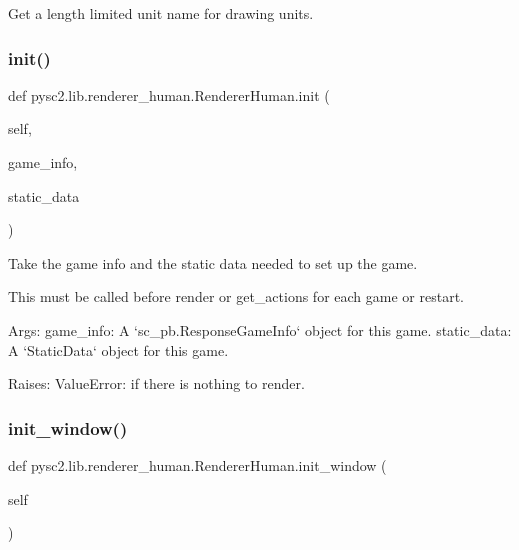 \begin{DoxyVerb}Get a length limited unit name for drawing units.\end{DoxyVerb}
 \mbox{\label{classpysc2_1_1lib_1_1renderer__human_1_1_renderer_human_a5f454c5d09ca1ef6e270fd0b1823ac09}} 
\subsubsection{\texorpdfstring{init()}{init()}}
{\footnotesize\ttfamily def pysc2.\+lib.\+renderer\+\_\+human.\+Renderer\+Human.\+init (\begin{DoxyParamCaption}\item[{}]{self,  }\item[{}]{game\+\_\+info,  }\item[{}]{static\+\_\+data }\end{DoxyParamCaption})}

\begin{DoxyVerb}Take the game info and the static data needed to set up the game.

This must be called before render or get_actions for each game or restart.

Args:
  game_info: A `sc_pb.ResponseGameInfo` object for this game.
  static_data: A `StaticData` object for this game.

Raises:
  ValueError: if there is nothing to render.
\end{DoxyVerb}
 \mbox{\label{classpysc2_1_1lib_1_1renderer__human_1_1_renderer_human_ab8c4fc4c1c501a62c5f13315c1d0268b}} 
\subsubsection{\texorpdfstring{init\+\_\+window()}{init\_window()}}
{\footnotesize\ttfamily def pysc2.\+lib.\+renderer\+\_\+human.\+Renderer\+Human.\+init\+\_\+window (\begin{DoxyParamCaption}\item[{}]{self }\end{DoxyParamCaption})}

